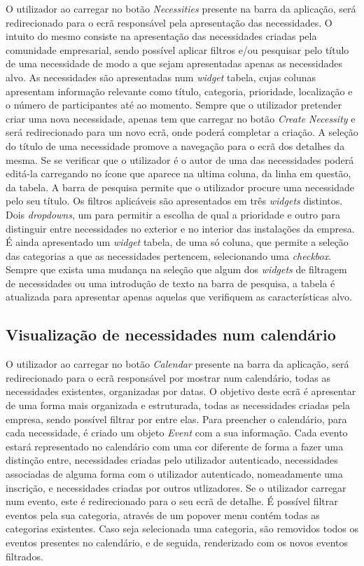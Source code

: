 \documentclass[a4paper,openright,11pt]{report}
\begin{document}
O utilizador ao carregar no botão \textit{Necessities} presente na barra da aplicação, será redirecionado para o ecrã responsável pela apresentação das necessidades. 
O intuito do mesmo consiste na apresentação das necessidades criadas pela comunidade empresarial, sendo possível aplicar filtros e/ou pesquisar pelo título de uma necessidade de modo a que sejam apresentadas apenas as necessidades alvo.
As necessidades são apresentadas num \textit{widget} tabela, cujas colunas apresentam informação relevante como título, categoria, prioridade, localização e o número de participantes até ao momento. Sempre que o utilizador pretender criar uma nova necessidade, apenas tem que carregar no botão \textit{Create Necessity} e será redirecionado para um novo ecrã, onde poderá completar a criação.
A seleção do título de uma necessidade promove a navegação para o ecrã dos detalhes da mesma. Se se verificar que o utilizador é o autor de uma das necessidades poderá editá-la carregando no ícone que aparece na ultima coluna, da linha em questão, da tabela.
A barra de pesquisa permite que o utilizador procure uma necessidade pelo seu título.
Os filtros aplicáveis são apresentados em três \textit{widgets} distintos. Dois \textit{dropdowns}, um para permitir a escolha de qual a prioridade e outro para distinguir entre necessidades no exterior e no interior das instalações da empresa.
É ainda apresentado um \textit{widget} tabela, de uma só coluna, que permite a seleção das categorias a que as necessidades pertencem, selecionando uma \textit{checkbox}.  
Sempre que exista uma mudança na seleção que algum dos \textit{widgets} de filtragem de necessidades ou uma introdução de texto na barra de pesquisa, a tabela é atualizada para apresentar apenas aquelas que verifiquem as características alvo. 

\subsection*{Visualização de necessidades num calendário}\label{sec:calendarNecessitiesView}
O utilizador ao carregar no botão \textit{Calendar} presente na barra da aplicação, será redirecionado para o ecrã responsável por mostrar num calendário, todas as necessidades existentes, organizadas por datas. 
O objetivo deste ecrã é apresentar de uma forma mais organizada e estruturada, todas as necessidades criadas pela empresa, sendo possível filtrar por entre elas. 
Para preencher o calendário, para cada necessidade, é criado um objeto \textit{Event} com a sua informação. 
Cada evento estará representado no calendário com uma cor diferente de forma a fazer uma distinção entre, necessidades criadas pelo utilizador autenticado, necessidades associadas de alguma forma com o utilizador autenticado, nomeadamente uma inscrição, e necessidades criadas por outros utlizadores.
Se o utilizador carregar num evento, este é redirecionado para o seu ecrã de detalhe. 
É possível filtrar eventos pela sua categoria, através de um popover menu contém todas as categorias existentes. 
Caso seja selecionada uma categoria, são removidos todos os eventos presentes no calendário, e de seguida, renderizado com os novos eventos filtrados.
\end{document}
